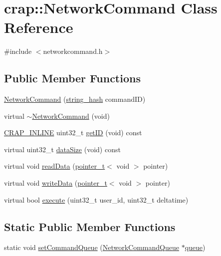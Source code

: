 \hypertarget{classcrap_1_1_network_command}{}\section{crap\+:\+:Network\+Command Class Reference}
\label{classcrap_1_1_network_command}


{\ttfamily \#include $<$networkcommand.\+h$>$}

\subsection*{Public Member Functions}
\begin{DoxyCompactItemize}
\item 
\hyperlink{classcrap_1_1_network_command_ab999cfcd21f282b80333259d54db87c8}{Network\+Command} (\hyperlink{classcrap_1_1string__hash}{string\+\_\+hash} command\+I\+D)
\item 
virtual \hyperlink{classcrap_1_1_network_command_a97a8532352de761659276792e0142e5f}{$\sim$\+Network\+Command} (void)
\item 
\hyperlink{config__x86_8h_a5a40526b8d842e7ff731509998bb0f1c}{C\+R\+A\+P\+\_\+\+I\+N\+L\+I\+N\+E} uint32\+\_\+t \hyperlink{classcrap_1_1_network_command_a45b28b5d7b7146126f8ab6bc0bfe88e7}{get\+I\+D} (void) const 
\item 
virtual uint32\+\_\+t \hyperlink{classcrap_1_1_network_command_a1947603a4f1417094b320838f333f367}{data\+Size} (void) const 
\item 
virtual void \hyperlink{classcrap_1_1_network_command_afda982ac39b2cb1104a30b8d6991738c}{read\+Data} (\hyperlink{structcrap_1_1pointer__t}{pointer\+\_\+t}$<$ void $>$ pointer)
\item 
virtual void \hyperlink{classcrap_1_1_network_command_ab05cc2392f21413b4b23c36fd2345a78}{write\+Data} (\hyperlink{structcrap_1_1pointer__t}{pointer\+\_\+t}$<$ void $>$ pointer)
\item 
virtual bool \hyperlink{classcrap_1_1_network_command_af051483dd8f5263afcc6e25e06219fc1}{execute} (uint32\+\_\+t user\+\_\+id, uint32\+\_\+t deltatime)
\end{DoxyCompactItemize}
\subsection*{Static Public Member Functions}
\begin{DoxyCompactItemize}
\item 
static void \hyperlink{classcrap_1_1_network_command_a3b5c5c0e38708b9d1695595a052d4b12}{set\+Command\+Queue} (\hyperlink{classcrap_1_1_network_command_queue}{Network\+Command\+Queue} $\ast$\hyperlink{classcrap_1_1queue}{queue})
\end{DoxyCompactItemize}


